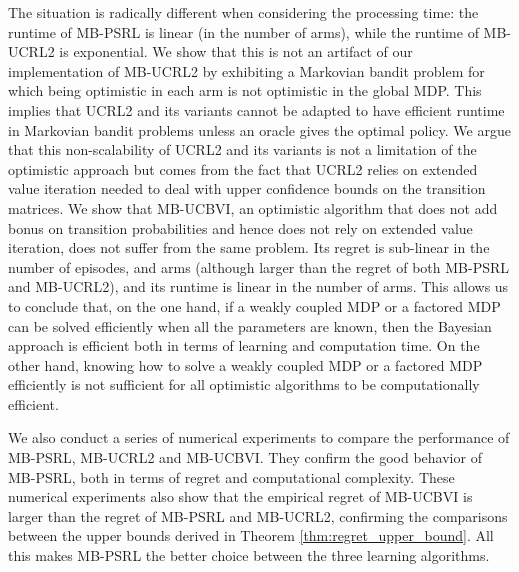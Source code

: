 The situation is radically different when considering the processing time: the runtime of MB-PSRL is linear (in the number of arms), while the runtime of MB-UCRL2 is exponential. We show that this is not an artifact of our implementation of MB-UCRL2 by exhibiting a Markovian bandit problem for which being optimistic in each arm is not optimistic in the global MDP. This implies that UCRL2 and its variants \cite{bourel2020tightening,fruit2018efficient,talebi2018variance,filippi2010optimism} cannot be adapted to have efficient runtime in Markovian bandit problems unless an oracle gives the optimal policy. We argue that this non-scalability of UCRL2 and its variants is not a limitation  of the optimistic approach but comes from the fact that UCRL2 relies on  extended value iteration \cite{jaksch2010near} needed to deal with  upper confidence bounds on the transition matrices.  We show that MB-UCBVI, an optimistic algorithm that does not add bonus on transition probabilities and hence does not rely on extended value iteration,  does not suffer from the same problem. Its  regret is  sub-linear in the number of episodes, and arms (although larger than the regret of both MB-PSRL and MB-UCRL2), and its  runtime is linear in the number of arms.
This allows us to conclude that, on the one hand, if a weakly coupled MDP or a factored MDP can be solved efficiently when all the parameters are known, then the Bayesian approach is efficient both in terms of learning and computation time. On the other hand, knowing how to solve a weakly coupled MDP or a factored MDP efficiently is not sufficient for all optimistic algorithms to be computationally efficient.

We also conduct a series of numerical experiments to compare the performance of MB-PSRL,  MB-UCRL2 and MB-UCBVI.  They confirm the good behavior of MB-PSRL, both in terms of regret and computational complexity. These numerical experiments also show that the empirical regret of MB-UCBVI is larger than the regret of MB-PSRL and MB-UCRL2, confirming the comparisons between the upper bounds derived in Theorem \ref{thm:regret_upper_bound}. All this  makes MB-PSRL the better choice between the three learning algorithms.

